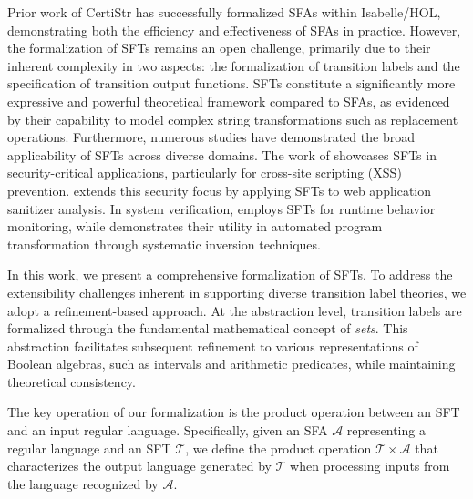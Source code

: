 


Prior work of CertiStr \cite{cpp/KanLRS22} has successfully formalized SFAs within Isabelle/HOL, demonstrating both the efficiency and effectiveness of SFAs in practice. However, the formalization of SFTs remains an open challenge, primarily due to their inherent complexity in two aspects: the formalization of transition labels and the specification of transition output functions. SFTs constitute a significantly more expressive and powerful theoretical framework compared to  SFAs, as evidenced by their capability to model complex string transformations such as replacement operations.
%
Furthermore, numerous studies have demonstrated the broad applicability of SFTs across diverse domains. The work of \cite{VeanesHLMB12Transducer} showcases SFTs in security-critical applications, particularly for cross-site scripting (XSS) prevention. \cite{uss/HooimeijerLMSV11} extends this security focus by applying SFTs to web application sanitizer analysis. In system verification, \cite{osdi/YaseenABCL20} employs SFTs for runtime behavior monitoring, while \cite{pldi/HuD17} demonstrates their utility in automated program transformation through systematic inversion techniques.



 
In this work, we present a comprehensive formalization of SFTs. To address the extensibility challenges inherent in supporting diverse transition label theories, we adopt a refinement-based approach. At the abstraction level, transition labels are formalized through the fundamental mathematical concept of \emph{sets}. This abstraction facilitates subsequent refinement to various representations of Boolean algebras, such as intervals and arithmetic predicates, while maintaining theoretical consistency.

The key operation of our formalization is the product operation between an SFT and an input regular language. Specifically, given an SFA $\mathcal{A}$ representing a regular language and an SFT $\mathcal{T}$, we define the product operation $\mathcal{T} \times\mathcal{A}$ that characterizes the output language generated by $\mathcal{T}$ when processing inputs from the language recognized by $\mathcal{A}$.


